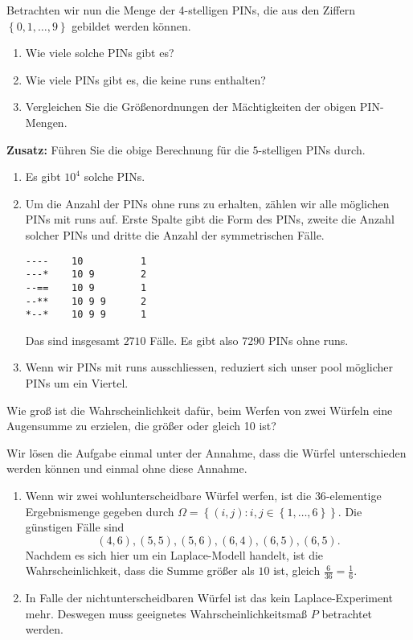 Betrachten wir nun die Menge der 4-stelligen PINs, die aus den Ziffern $\left\{
0,1, \dots, 9 \right\}$ gebildet werden können. 
\begin{enumerate}
    \item Wie viele solche PINs gibt es?
    \item Wie viele PINs gibt es, die keine runs enthalten?
    \item Vergleichen Sie die Größenordnungen der Mächtigkeiten der obigen
        PIN-Mengen. 
\end{enumerate}
\textbf{Zusatz:} Führen Sie die obige Berechnung für die $5$-stelligen PINs durch.

\solution
\begin{enumerate}
    \item Es gibt $10^4$ solche PINs.
    \item Um die Anzahl der PINs ohne runs zu erhalten, zählen wir alle
        möglichen PINs mit runs auf. Erste Spalte gibt die Form des PINs,
        zweite die Anzahl solcher PINs und dritte die Anzahl der symmetrischen
        Fälle.
\begin{lstlisting}
----    10          1
---*    10 9        2
--==    10 9        1
--**    10 9 9      2
*--*    10 9 9      1
\end{lstlisting}
        Das sind insgesamt $2710$ Fälle. Es gibt also $7290$ PINs ohne runs.
    \item Wenn wir PINs mit runs ausschliessen, reduziert sich unser pool
        möglicher PINs um ein Viertel. 
\end{enumerate}


Wie groß ist die Wahrscheinlichkeit dafür, beim Werfen von zwei Würfeln eine
Augensumme zu erzielen, die größer oder gleich 10 ist?

\solution Wir lösen die Aufgabe einmal unter der Annahme, dass die Würfel
unterschieden werden können und einmal ohne diese Annahme. 
\begin{enumerate}
    \item Wenn wir zwei wohlunterscheidbare Würfel werfen, ist die
        $36$-elementige Ergebnismenge gegeben durch $\Omega = \left\{ (i,j) :
        i,j \in \left\{ 1, \dots, 6 \right\} \right\}$. Die günstigen Fälle
        sind 
        \begin{equation}
            (4,6), (5,5), (5,6), (6,4), (6,5), (6,5).
        \end{equation}
        Nachdem es sich hier um ein Laplace-Modell handelt, ist die
        Wahrscheinlichkeit, dass die Summe größer als $10$ ist, gleich
        $\frac{6}{36}= \frac{1}{6}$.

    \item In Falle der nichtunterscheidbaren Würfel ist das kein
        Laplace-Experiment mehr. Deswegen muss geeignetes
        Wahrscheinlichkeitsmaß $P$ betrachtet werden. 
\end{enumerate}


